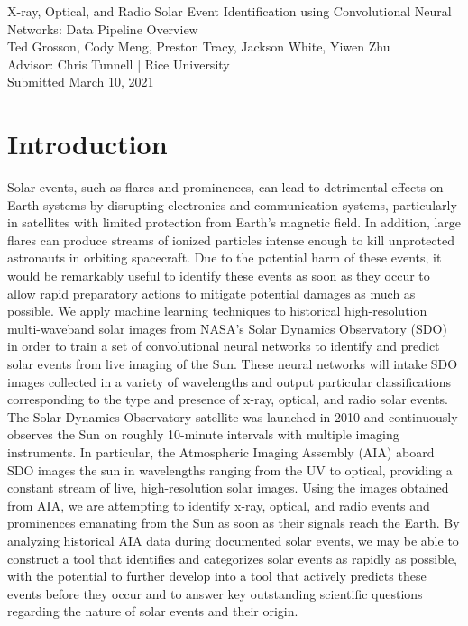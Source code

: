 \documentclass[12pt, letterpaper]{article}
\begin{document}
\begin{center}
    \Large X-ray, Optical, and Radio Solar Event Identification using Convolutional Neural Networks: Data Pipeline Overview \\
    \vspace{.6em}
    \large Ted Grosson, Cody Meng, Preston Tracy, Jackson White, Yiwen Zhu
    \vspace{.3em}
    \\ Advisor: Chris Tunnell | Rice University
    \vspace{.5em}
    \normalsize
    \\ Submitted March 10, 2021
    \\
\end{center} \vspace{-2.3em}


\section*{Introduction}

Solar events, such as flares and prominences, can lead to detrimental effects on Earth systems by disrupting electronics and communication systems, particularly in satellites with limited protection from Earth's magnetic field. In addition, large flares can produce streams of ionized particles intense enough to kill unprotected astronauts in orbiting spacecraft. Due to the potential harm of these events, it would be remarkably useful to identify these events as soon as they occur to allow rapid preparatory actions to mitigate potential damages as much as possible. We apply machine learning techniques to historical high-resolution multi-waveband solar images from NASA's Solar Dynamics Observatory (SDO) in order to train a set of convolutional neural networks to identify and predict solar events from live imaging of the Sun. These neural networks will intake SDO images collected in a variety of wavelengths and output particular classifications corresponding to the type and presence of x-ray, optical, and radio solar events. The Solar Dynamics Observatory satellite was launched in 2010 and continuously observes the Sun on roughly 10-minute intervals with multiple imaging instruments. In particular, the Atmospheric Imaging Assembly (AIA) aboard SDO images the sun in wavelengths ranging from the UV to optical, providing a constant stream of live, high-resolution solar images\cite{Pesnell2012}. Using the images obtained from AIA, we are attempting to identify x-ray, optical, and radio events and prominences emanating from the Sun as soon as their signals reach the Earth. By analyzing historical AIA data during documented solar events, we may be able to construct a tool that identifies and categorizes solar events as rapidly as possible, with the potential to further develop into a tool that actively predicts these events before they occur and to answer key outstanding scientific questions regarding the nature of solar events and their origin. 
\end{document}
